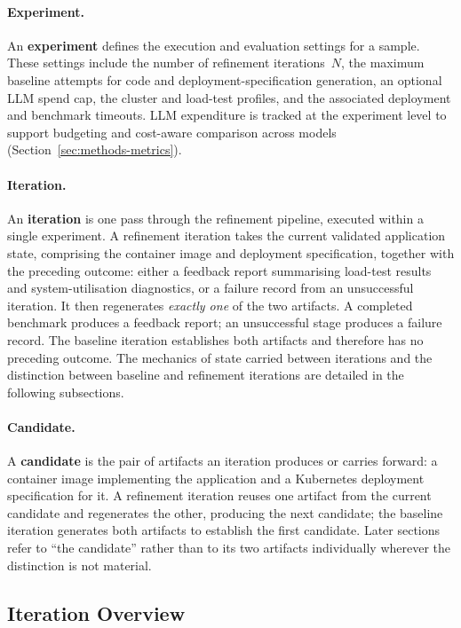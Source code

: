 \paragraph{Experiment.}
An \textbf{experiment} defines the execution and evaluation settings for a
sample. These settings include the number of refinement iterations~$N$, the
maximum baseline attempts for code and deployment-specification generation,
an optional LLM spend cap, the cluster and load-test profiles, and the
associated deployment and benchmark timeouts. LLM expenditure is tracked at
the experiment level to support budgeting and cost-aware comparison across
models (Section~\ref{sec:methods-metrics}).

\paragraph{Iteration.}
An \textbf{iteration} is one pass through the refinement pipeline, executed
within a single experiment. A refinement iteration takes the current validated
application state, comprising the container image and deployment specification,
together
with the preceding outcome: either a feedback report summarising load-test
results and system-utilisation diagnostics, or a failure record from an
unsuccessful iteration. It then regenerates \emph{exactly one} of the two
artifacts. A completed benchmark produces a feedback report; an unsuccessful
stage produces a failure record. The baseline iteration establishes both
artifacts and therefore has no preceding outcome. The mechanics of state
carried between iterations and the distinction between baseline and refinement
iterations are detailed in the following subsections.

\paragraph{Candidate.}
A \textbf{candidate} is the pair of artifacts an iteration produces or
carries forward: a container image implementing the application and a
Kubernetes deployment specification for it. A refinement iteration reuses
one artifact from the current candidate and regenerates the other, producing
the next candidate; the baseline iteration generates both artifacts to
establish the first candidate. Later sections refer to ``the candidate''
rather than to its two artifacts individually wherever the distinction is
not material.

\subsection{Iteration Overview}
\label{sec:methods-iteration-overview}

